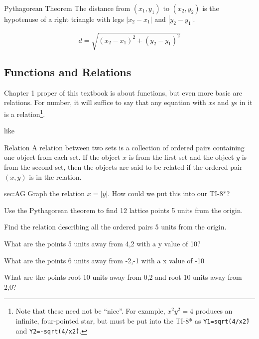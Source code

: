 \begin{derivation}{Pythagorean Theorem}
The distance from $(x_1,y_1)$ to $(x_2,y_2)$ is the hypotenuse of a right triangle with legs
$|x_2-x_1|$ and $|y_2-y_1|$.

\begin{equation}
d=\sqrt{(x_2-x_1)^2+(y_2-y_1)^2}
\end{equation}
\end{derivation}

\subsection{Functions and Relations}

Chapter 1 proper of this textbook is about functions, but even more basic are relations.  
For number, it will suffice
to say that any equation with $x$s and $y$s in it is a 
relation\footnote{Note that these need not be ``nice''.  For example,
$x^2y^2=4$ produces an infinite, four-pointed star, but must be put into the TI-8* as \texttt{Y1=sqrt(4/x\^2)} and 
\texttt{Y2=-sqrt(4/x\^2)}.}.  

like 
\begin{derivation}{Relation}
A relation between two sets is a collection of ordered pairs containing one object from each set. 
If the object $x$ is from the first set and the object $y$ is from the second set, then the objects are said to be related if the ordered pair $(x,y)$ is in the relation.
\end{derivation}

\ExSection[Exercises]
\begin{exercises}{sec:AG}
\prob{}Graph the relation $x=|y|$.  How could we put this into our TI-8*?



\prob{}Use the Pythagorean theorem to find 12 lattice points 5 units from the origin.

\prob{}Find the relation describing all the ordered pairs 5 units from the origin.

\prob{}What are the points 5 units away from 4,2 with a y value of 10?

\prob{}What are the points 6 units away from -2,-1 with a x value of -10

\prob{}What are the points root 10 units away from 0,2 and root 10 units away from 2,0?
\end{exercises}

